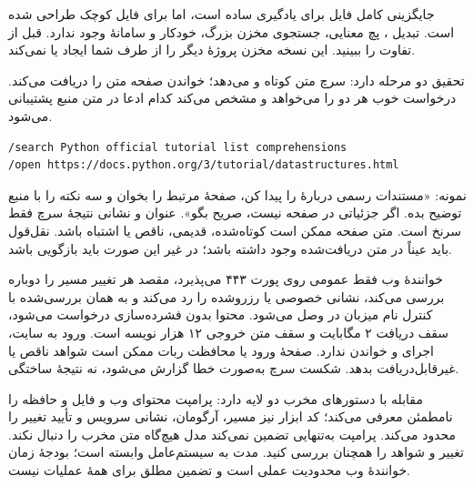 جایگزینی کامل فایل برای یادگیری ساده است، اما برای فایل کوچک طراحی شده است. تبدیل 
، پچ معنایی، جستجوی مخزن بزرگ، 
 خودکار و سامانهٔ 
 وجود ندارد. قبل از 
 تفاوت 
 را ببینید. این نسخه مخزن پروژهٔ دیگر را از طرف شما ایجاد یا 
 نمی‌کند.

تحقیق دو مرحله دارد: سرچ متن کوتاه و 
 می‌دهد؛ خواندن صفحه متن 
 را دریافت می‌کند. درخواست خوب هر دو را می‌خواهد و مشخص می‌کند کدام ادعا در متن منبع پشتیبانی می‌شود.

\begin{LTR}
\begin{Verbatim}[breaklines,breakanywhere,fontsize=\small]
/search Python official tutorial list comprehensions
/open https://docs.python.org/3/tutorial/datastructures.html
\end{Verbatim}
\end{LTR}

نمونه: «مستندات رسمی 
 دربارهٔ 
 را پیدا کن، صفحهٔ مرتبط را بخوان و سه نکته را با 
 منبع توضیح بده. اگر جزئیاتی در صفحه نیست، صریح بگو». عنوان و نشانی نتیجهٔ سرچ فقط سرنخ است. متن صفحه ممکن است کوتاه‌شده، قدیمی، ناقص یا اشتباه باشد. نقل‌قول باید عیناً در متن دریافت‌شده وجود داشته باشد؛ در غیر این صورت باید بازگویی باشد.

خوانندهٔ وب فقط 
 عمومی روی پورت ۴۴۳ می‌پذیرد، مقصد هر تغییر مسیر را دوباره بررسی می‌کند، نشانی خصوصی یا رزروشده را رد می‌کند و به همان 
 بررسی‌شده با کنترل نام میزبان در 
 وصل می‌شود. محتوا بدون فشرده‌سازی درخواست می‌شود، سقف دریافت ۲ مگابایت و سقف متن خروجی ۱۲ هزار نویسه است. ورود به سایت، اجرای 
 و خواندن 
 ندارد. صفحهٔ ورود یا محافظت ربات ممکن است شواهد ناقص یا غیرقابل‌دریافت بدهد. شکست سرچ به‌صورت خطا گزارش می‌شود، نه نتیجهٔ ساختگی.

مقابله با دستورهای مخرب دو لایه دارد: پرامپت محتوای وب و فایل و حافظه را نامطمئن معرفی می‌کند؛ کد ابزار نیز مسیر، آرگومان، نشانی سرویس و تأیید تغییر را محدود می‌کند. پرامپت به‌تنهایی تضمین نمی‌کند مدل هیچ‌گاه متن مخرب را دنبال نکند. تغییر و شواهد را همچنان بررسی کنید. مدت 
 به 
 سیستم‌عامل وابسته است؛ بودجهٔ زمان خوانندهٔ وب محدودیت عملی است و تضمین مطلق برای همهٔ عملیات 
 نیست.

\cite{ddgs}
